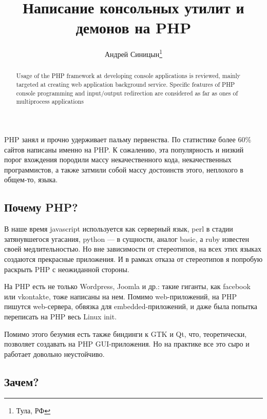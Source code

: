 \documentclass[10pt, a5paper]{article}
\begin{document}
\title{Написание консольных утилит и демонов на PHP}%

\author{Андрей Синицын\footnote{Тула, РФ}}
\maketitle

\begin{abstract}
Usage of the PHP framework at developing console applications is reviewed, mainly targeted at creating web application background service. Specific features of PHP console programming and input/output redirection are considered as far as ones of multiprocess applications
\end{abstract}

PHP занял и прочно удерживает пальму первенства. По статистике более 60\% сайтов написаны именно на PHP. К сожалению, эта популярность и низкий порог вхождения породили массу некачественного кода, некачественных программистов, а также затмили собой массу достоинств этого, неплохого в общем-то, языка.

\subsection*{Почему PHP?}

В наше время javascript используется как серверный язык, perl в стадии затянувшегося угасания, python — в сущности, аналог basic, а ruby известен своей медлительностью. Но вне зависимости от стереотипов, на всех этих языках создаются прекрасные приложения. И в рамках отказа от стереотипов я попробую раскрыть PHP с неожиданной стороны.

На PHP есть не только Wordpress, Joomla и др.: такие гиганты, как facebook или vkontakte, тоже написаны на нем. Помимо web-приложений, на PHP пишутся web-сервера, обвязка для embedded-приложений, и даже была попытка переписать на PHP весь Linux init.

Помимо этого безумия есть также биндинги к GTK и Qt, что, теоретически, позволяет создавать на PHP GUI-приложения. Но на практике все это сыро и работает довольно неустойчиво.

\subsection*{Зачем?}
\end{document}
